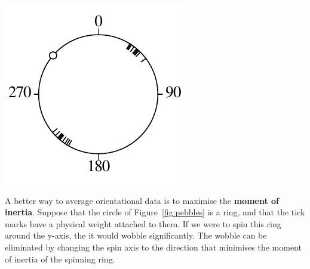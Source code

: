 \noindent\begin{minipage}[t][][b]{.25\textwidth}
\includegraphics[width=\textwidth]{../figures/pebbles.pdf}\medskip
\end{minipage}
\begin{minipage}[t][][t]{.75\textwidth}
  \label{fig:pebbles}
\end{minipage}

A better way to average orientational data is to maximise the
\textbf{moment of inertia}. Suppose that the circle of
Figure~\ref{fig:pebbles} is a ring, and that the tick marks have a
physical weight attached to them. If we were to spin this ring around
the y-axis, the it would wobble significantly. The wobble can be
eliminated by changing the spin axis to the direction that minimises
the moment of inertia of the spinning ring.

